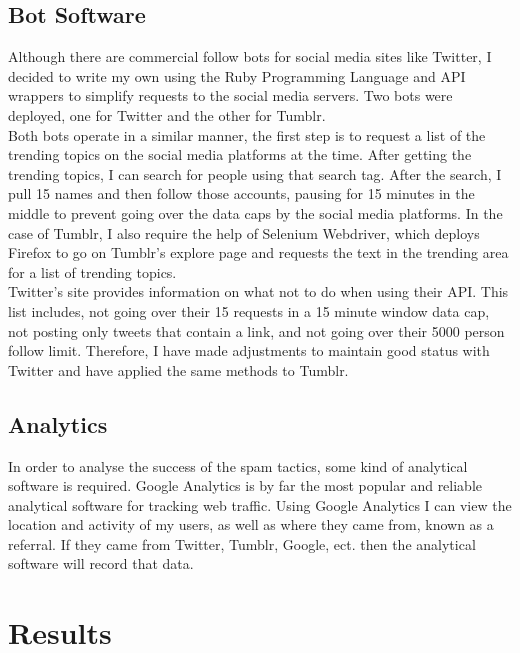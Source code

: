 \documentclass{article}
\begin{document}
\subsection{Bot Software}
Although there are commercial follow bots for social media sites like Twitter, I decided to write my own using the Ruby Programming Language and API wrappers to simplify requests to the social media servers. Two bots were deployed, one for Twitter and the other for Tumblr.
\\
Both bots operate in a similar manner, the first step is to request a list of the trending topics on the social media platforms at the time. After getting the trending topics, I can search for people using that search tag. After the search, I pull 15 names and then follow those accounts, pausing for 15 minutes in the middle to prevent going over the data caps by the social media platforms. In the case of Tumblr, I also require the help of Selenium Webdriver, which deploys Firefox to go on Tumblr's explore page and requests the text in the trending area for a list of trending topics. \\
Twitter's site provides information on what not to do when using their API. This list includes, not going over their 15 requests in a 15 minute window data cap, not posting only tweets that contain a link, and not going over their 5000 person follow limit. Therefore, I have made adjustments to maintain good status with Twitter and have applied the same methods to Tumblr.  

\subsection{Analytics}
In order to analyse the success of the spam tactics, some kind of analytical software is required. Google Analytics is by far the most popular and reliable analytical software for tracking web traffic. Using Google Analytics I can view the location and activity of my users, as well as where they came from, known as a referral. If they came from Twitter, Tumblr, Google, ect. then the analytical software will record that data.

\section{Results}
\end{document}
